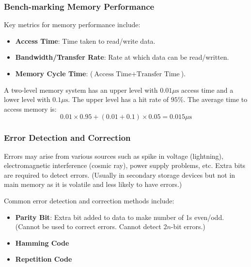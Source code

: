 \subsubsection{Bench-marking Memory Performance}

Key metrics for memory performance include:
\begin{itemize}
    \item \textbf{Access Time}: Time taken to read/write data.
    \item \textbf{Bandwidth/Transfer Rate}: Rate at which data can be read/written.
    \item \textbf{Memory Cycle Time}: ($\text{Access Time} + \text{Transfer Time}$).
\end{itemize}

\begin{example}
    A two-level memory system has an upper level with $0.01\mu \text{s}$ access time and
    a lower level with $0.1\mu \text{s}$. The upper level has a hit rate of $95\%$. The
    average time to access memory is:
    \begin{equation*}
        0.01 \times 0.95 + (0.01 + 0.1) \times 0.05 = 0.015\mu \text{s}
    \end{equation*}
\end{example}

\subsubsection{Error Detection and Correction}

Errors may arise from various sources such as spike in voltage (lightning), electromagnetic
interference (cosmic ray), power supply problems, etc. Extra bits are required to detect errors.
(Usually in secondary storage devices but not in main memory as it is volatile and less likely
to have errors.)

Common error detection and correction methods include:
\begin{itemize}
    \item \textbf{Parity Bit}: Extra bit added to data to make number of 1s even/odd.
        (Cannot be used to correct errors. Cannot detect 2$n$-bit errors.)
    \item \textbf{Hamming Code}
    \item \textbf{Repetition Code}
\end{itemize}